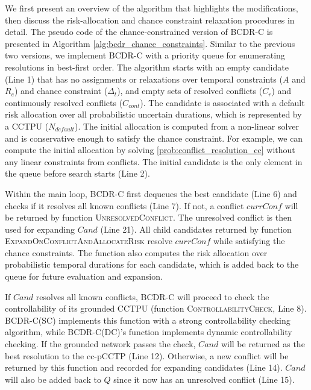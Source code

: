 \documentclass[jair,twoside,11pt,theapa]{article}
\begin{document}
We first present an overview of the algorithm that highlights the modifications,
then discuss the risk-allocation and chance constraint relaxation procedures in
detail. The pseudo code of the chance-constrained version of BCDR-C is presented
in Algorithm \ref{alg:bcdr_chance_constraints}. Similar to the previous two
versions, we implement BCDR-C with a priority queue for enumerating resolutions
in best-first order. The algorithm starts with an empty candidate (Line 1) that
has no assignments or relaxations over temporal constraints ($A$ and $R_{e}$)
and chance constraint ($\Delta_t$), and empty sets of resolved conflicts
($C_r$) and continuously resolved conflicts ($C_{cont}$). The candidate is associated with a default risk allocation over all
probabilistic uncertain durations, which is represented by a CCTPU
($N_{default}$). The initial allocation is computed from a non-linear solver and
is conservative enough to satisfy the chance constraint. For example, we can
compute the initial allocation by solving \ref{prob:conflict_resolution_cc}
without any linear constraints from conflicts.  The initial candidate is the
only element in the queue before search starts (Line 2).


Within the main loop, BCDR-C first dequeues the best candidate (Line 6) and
checks if it resolves all known conflicts (Line 7). If not, a conflict
$\mathit{currConf}$ will be returned by function \textsc{UnresolvedConflict}. The
unresolved conflict is then used for expanding $\mathit{Cand}$ (Line 21). All child
candidates returned by function \textsc{ExpandOnConflictAndAllocateRisk} resolve
$\mathit{currConf}$ while satisfying the chance constraints. The function also computes
the risk allocation over probabilistic temporal durations for each candidate,
which is added back to the queue for future evaluation and expansion.


If $\mathit{Cand}$ resolves all known conflicts, BCDR-C will proceed to check the
controllability of its grounded CCTPU (function \textsc{ControllabilityCheck},
Line 8). BCDR-C(SC) implements this function with a strong controllability checking algorithm, while BCDR-C(DC)'s function implements dynamic controllability checking. If the grounded network passes the check, $\mathit{Cand}$ will be returned as the best resolution to the
cc-pCCTP (Line 12). Otherwise, a new conflict will be returned by this function
and recorded for expanding candidates (Line 14). $\mathit{Cand}$ will also be added back
to $Q$ since it now has an unresolved conflict (Line 15).
\end{document}
